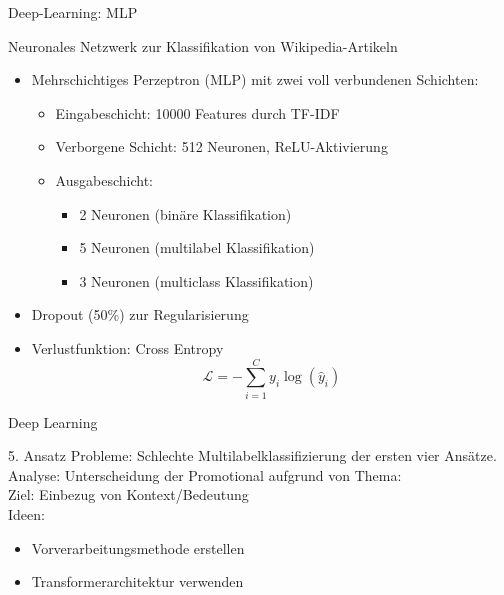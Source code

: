 \documentclass[aspectratio=169]{beamer} %
\begin{document}
\begin{frame}{Deep-Learning: MLP}
    \begin{block}{Neuronales Netzwerk zur Klassifikation von Wikipedia-Artikeln}
        \begin{itemize}
            \item Mehrschichtiges Perzeptron (MLP) mit zwei voll verbundenen Schichten:
                  \begin{itemize}
                      \item Eingabeschicht: 10000 Features durch TF-IDF
                      \item Verborgene Schicht: 512 Neuronen, ReLU-Aktivierung
                      \item Ausgabeschicht:
                      \begin{itemize}
                          \item 2 Neuronen (binäre Klassifikation)
                          \item 5 Neuronen (multilabel Klassifikation)
                          \item 3 Neuronen (multiclass Klassifikation)
                      \end{itemize}
                  \end{itemize}
            \item Dropout (50\%) zur Regularisierung
            \item Verlustfunktion: Cross Entropy
                  \begin{equation*}
                      \mathcal{L} = - \sum_{i=1}^{C} y_i \log(\hat{y}_i)
                  \end{equation*}
        \end{itemize}
    \end{block}
\end{frame}


\begin{frame}{Deep Learning}
    \begin{block}{5. Ansatz}
        Probleme: Schlechte Multilabelklassifizierung der ersten vier Ansätze. \\
        Analyse: Unterscheidung der Promotional aufgrund von Thema: \\
        Ziel:
        Einbezug von Kontext/Bedeutung \\
        Ideen:
        \begin{itemize}
            \item Vorverarbeitungsmethode erstellen
            \item Transformerarchitektur verwenden
        \end{itemize}
    \end{block}
\end{frame}
\end{document}
